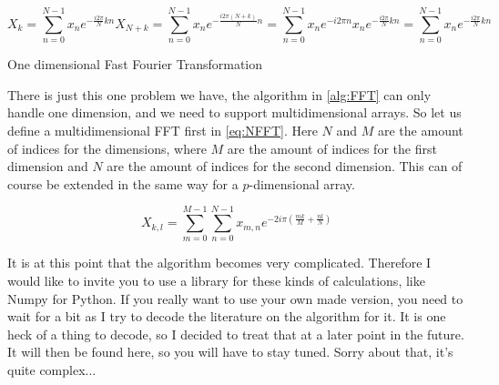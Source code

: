 \begin{subequations}
    \begin{equation}
        X_k = \sum_{n = 0}^{N - 1} x_ne^{-\frac{i2\pi}{N}kn}
        \label{eq:dft}
    \end{equation}
    \begin{equation}
        X_{N + k} = \sum_{n = 0}^{N - 1} x_ne^{-\frac{i2\pi(N + k)}{N}n} = \sum_{n = 0}^{N - 1} x_ne^{-i2\pi n}x_ne^{-\frac{i2\pi}{N}kn} = \sum_{n = 0}^{N - 1} x_ne^{-\frac{i2\pi}{N}kn}
        \label{eq:dftex}
    \end{equation}
\end{subequations}

\begin{algorithm}
     
    \caption{One dimensional Fast Fourier Transformation}
    \label{alg:FFT}
\end{algorithm}

There is just this one problem we have, the algorithm in \autoref{alg:FFT} can only handle one dimension, and we need to support multidimensional arrays. So let us define a multidimensional FFT 
first in \autoref{eq:NFFT}. Here $N$ and $M$ are the amount of indices for the dimensions, where $M$ are the amount of indices for the first dimension and $N$ are the amount of indices for the 
second dimension. This can of course be extended in the same way for a $p$-dimensional array.

\begin{equation}
    X_{k,l} = \sum_{m = 0}^{M - 1}\sum_{n = 0}^{N - 1} x_{m, n}e^{-2i\pi(\frac{mk}{M} + \frac{nl}{N})}
    \label{eq:NFFT}
\end{equation}

It is at this point that the algorithm becomes very complicated. Therefore I would like to invite you to use a library for these kinds of calculations, like Numpy \cite{numpy} for Python. If you
really want to use your own made version, you need to wait for a bit as I try to decode the literature on the algorithm for it. It is one heck of a thing to decode, so I decided to treat that at 
a later point in the future. It will then be found here, so you will have to stay tuned. Sorry about that, it's quite complex...

